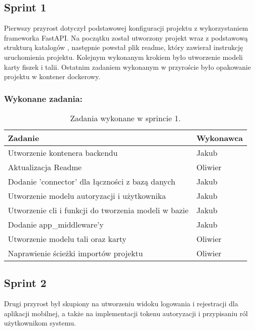 \subsection{Sprint 1}

Pierwszy przyrost dotyczył podstawowej konfiguracji projektu z wykorzystaniem frameworka FastAPI. Na początku został utworzony projekt wraz z podstawową strukturą katalogów , następnie powstał plik readme, który zawierał instrukcję uruchomienia projektu. Kolejnym wykonanym krokiem było utworzenie modeli karty fiszek i talii. Ostatnim zadaniem wykonanym w przyroście było opakowanie projektu w kontener dockerowy.

\subsubsection{Wykonane zadania:}

\begin{table}[H]
\centering
\begin{tabularx}{\textwidth}{|p{}|X|}
    \hline
    \textbf{Zadanie} & \textbf{Wykonawca} \\
    \hline
    Utworzenie kontenera backendu & Jakub \\
    \hline
    Aktualizacja Readme & Oliwier \\
    \hline
    [BACKEND] Dodanie 'connector' dla łączności z bazą danych & Jakub \\
    \hline
    [BACKEND] Utworzenie modelu autoryzacji i użytkownika & Jakub \\
    \hline
    [BACKEND] Utworzenie cli i funkcji do tworzenia modeli w bazie & Jakub \\
    \hline
    [BACKEND] Dodanie app\_middleware'y & Jakub \\
    \hline
    [BACKEND] Utworzenie modelu tali oraz karty & Oliwier \\
    \hline
    [BACKEND] Naprawienie ścieżki importów projektu & Oliwier \\
    \hline
\end{tabularx}
        \caption{Zadania wykonane w sprincie 1.}
\end{table}

\subsection{Sprint 2}

Drugi przyrost był skupiony na utworzeniu widoku logowania i rejestracji dla aplikacji
mobilnej, a także na implementacji tokenu autoryzacji i przypisaniu ról użytkownikom systemu.

